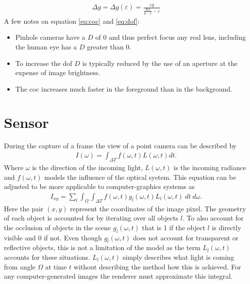 \begin{align}
    \Delta g = \Delta g(\varepsilon) = \frac{\varepsilon g}{\frac{D f}{g-f} - \varepsilon}
    \label{eq:dof}
\end{align}
A few notes on equation \ref{eq:coc} and \ref{eq:dof}:
\begin{itemize}
    \item Pinhole cameras have a $D$ of 0 and thus perfect focus any real lens, including the human eye has a $D$ greater than 0.
    \item To increase the \gls{dof} $D$ is typically reduced by the use of an aperture at the expense of image brightness.
    \item The \gls{coc} increases much faster in the foreground than in the background.
\end{itemize}







\section{Sensor}
During the capture of a frame the view of a point camera can be described by
\begin{align}
    I(\omega) = \int_{\Delta T} f(\omega,t) L(\omega,t)dt.
    \label{eq:mb-integral}
\end{align}
Where $\omega$ is the direction of the incoming light, $L(\omega,t)$ is the incoming radiance and $f(\omega,t)$ models the influence of the optical system.
This equation can be adjusted to be more applicable to computer-graphics systems as
\begin{align}
    I_{xy} = \sum_l \int_\Omega \int_{\Delta T} f(\omega, t) g_l(\omega, t) L_l(\omega, t) \: dt \: d\omega.
    \label{eq:mb-cg-integral}
\end{align}
Here the pair $(x,y)$ represent the coordinates of the image pixel.
The geometry of each object is accounted for by iterating over all objects $l$.
To also account for the occlusion of objects in the scene $g_l(\omega, t)$ that is 1 if the object $l$ is directly visible and 0 if not.
Even though $g_l(\omega, t)$ does not account for transparent or reflective objects, this is not a limitation of the model as the term $L_l(\omega, t)$ accounts for these situations.
$L_l(\omega, t)$ simply describes what light is coming from angle $\Omega$ at time $t$ without describing the method how this is achieved. \cite{Navarro.2011}
For any computer-generated images the renderer must approximate this integral.

